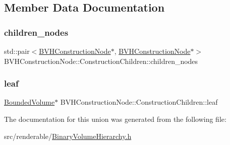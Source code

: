 \subsection{Member Data Documentation}
\mbox{\label{unionBVHConstructionNode_1_1ConstructionChildren_ac5e7d56943ed00d7165259481d7cb005}} 
\subsubsection{\texorpdfstring{children\_nodes}{children\_nodes}}
{\footnotesize\ttfamily std\+::pair$<$\mbox{\hyperlink{structBVHConstructionNode}{B\+V\+H\+Construction\+Node}}$\ast$, \mbox{\hyperlink{structBVHConstructionNode}{B\+V\+H\+Construction\+Node}}$\ast$$>$ B\+V\+H\+Construction\+Node\+::\+Construction\+Children\+::children\+\_\+nodes}

\mbox{\label{unionBVHConstructionNode_1_1ConstructionChildren_abd717eefbb1140cd74ab66c49771b728}} 
\subsubsection{\texorpdfstring{leaf}{leaf}}
{\footnotesize\ttfamily \mbox{\hyperlink{classBoundedVolume}{Bounded\+Volume}}$\ast$ B\+V\+H\+Construction\+Node\+::\+Construction\+Children\+::leaf}



The documentation for this union was generated from the following file\+:\begin{DoxyCompactItemize}
\item 
src/renderable/\mbox{\hyperlink{BinaryVolumeHierarchy_8h}{Binary\+Volume\+Hierarchy.\+h}}\end{DoxyCompactItemize}
